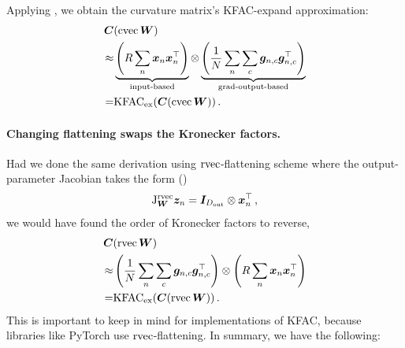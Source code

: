 Applying , we obtain the curvature matrix's KFAC-expand approximation:
\begin{align*}
  {\bm{C}}&(\operatorname{cvec} {\bm{W}}) \\
  \approx&
           \underbrace{\left( R \sum_n {\bm{x}}_n {\bm{x}}_n^{\top} \right)}_{\text{input-based}}
           \otimes
           \underbrace{\left( \frac{1}{N} \sum_n \sum_c {\bm{g}}_{n,c} {\bm{g}}_{n,c}^{\top} \right)}_{\text{grad-output-based}}
  \\
  =& \mathrm{KFAC}_{\text{ex}}({\bm{C}}(\operatorname{cvec} {\bm{W}}))\,.
\end{align*}

\paragraph{Changing flattening swaps the Kronecker factors.}
Had we done the same derivation using $\operatorname{rvec}$-flattening scheme where the output-parameter Jacobian takes the form ()
$$ \mathrm{J}^{\operatorname{rvec}}_{{\bm{W}}}{\bm{z}}_n = {\bm{I}}_{D_{\text{out}}} \otimes {\bm{x}}_n^{\top}\,,$$
we would have found the order of Kronecker factors to reverse,
\begin{align*}
  {\bm{C}}&(\operatorname{rvec} {\bm{W}}) \\
  \approx&
           \left( \frac{1}{N} \sum_n \sum_c {\bm{g}}_{n,c} {\bm{g}}_{n,c}^{\top} \right)
           \otimes
           \left( R \sum_n {\bm{x}}_n {\bm{x}}_n^{\top} \right)
  \\
  =& \mathrm{KFAC}_{\text{ex}}({\bm{C}}(\operatorname{rvec} {\bm{W}}))\,.
\end{align*}
This is important to keep in mind for implementations of KFAC, because libraries like PyTorch use $\operatorname{rvec}$-flattening.
In summary, we have the following:

\switchcolumn[1]
\switchcolumn[0]

